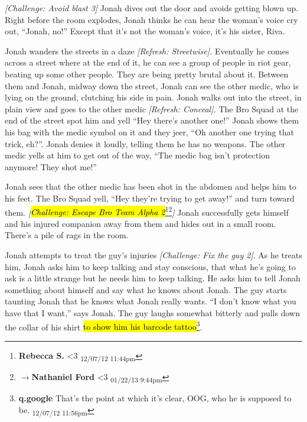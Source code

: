 \textit{{[}Challenge: Avoid blast 3{]}} Jonah dives out the door and avoids getting blown up.  Right before the room explodes, Jonah thinks he can hear the woman's voice cry out, ``Jonah, no!''  Except that it's not the woman's voice, it's his sister, Riva.



Jonah wanders the streets in a daze \textit{{[}Refresh: Streetwise{]}. }Eventually he comes across a street where at the end of it, he can see a group of people in riot gear, beating up some other people.  They are being pretty brutal about it.  Between them and Jonah, midway down the street, Jonah can see the other medic, who is lying on the ground, clutching his side in pain.  Jonah walks out into the street, in plain view and goes to the other medic \textit{{[}Refresh: Conceal{]}. }The Bro Squad at the end of the street spot him and yell ``Hey there's another one!''  Jonah shows them his bag with the medic symbol on it and they jeer, ``Oh another one trying that trick, eh?''.  Jonah denies it loudly, telling them he has no weapons.  The other medic yells at him to get out of the way, ``The medic bag isn't protection anymore!  They shot me!''



Jonah sees that the other medic has been shot in the abdomen and helps him to his feet.  The Bro Squad yell, ``Hey they're trying to get away!'' and turn toward them.  \textit{{[}}\textit{\hl{Challenge: Escape Bro Team Alpha 2}}\footnote{\textbf{Rebecca S. }\textless 3 \textsubscript{12/07/12 11:44pm}}\footnote{$\rightarrow$\textbf{Nathaniel Ford }\textless 3 \textsubscript{01/22/13 9:44pm}}\textit{{]}}  Jonah successfully gets himself and his injured companion away from them and hides out in a small room.  There's a pile of rags in the room.  



Jonah attempts to treat the guy's injuries \textit{{[}Challenge: Fix the guy 2{]}}.  As he treats him, Jonah asks him to keep talking and stay conscious, that what he's going to ask is a little strange but he needs him to keep talking.  He asks him to tell Jonah something about himself and say what he knows about Jonah.  The guy starts taunting Jonah that he knows what Jonah really wants.  ``I don't know what you have that I want,'' says Jonah. The guy laughs somewhat bitterly and pulls down the collar of his shirt \hl{to show him his barcode tattoo}\footnote{\textbf{q.google }That's the point at which it's clear, OOG, who he is supposed to be. \textsubscript{12/07/12 11:56pm}}.



